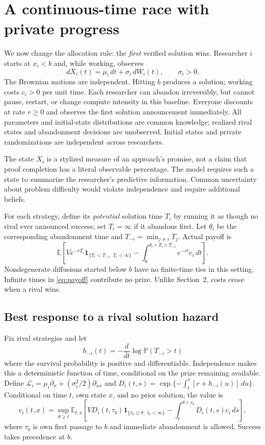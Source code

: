 \documentclass[11pt]{article}
\newcommand{\E}{\mathbb E}
\newcommand{\PP}{\mathbb P}
\newcommand{\ind}{\mathbf 1}
\newcommand{\Lgen}{\mathcal L}
\begin{document}
\section{A continuous-time race with private progress}
We now change the allocation rule: the \emph{first} verified solution wins.
Researcher $i$ starts at $x_i<b$ and, while working, observes
\begin{equation}\label{eq:diffusion}
dX_i(t)=\mu_i\,dt+\sigma_i\,dW_i(t),\qquad \sigma_i>0.
\end{equation}
The Brownian motions are independent. Hitting $b$ produces a solution;
working costs $c_i>0$ per unit time. Each researcher can abandon
irreversibly, but cannot pause, restart, or change compute intensity in
this baseline. Everyone discounts at rate $r\ge0$ and observes the first
solution announcement immediately. All parameters and initial-state
distributions are common knowledge; realized rival states and abandonment
decisions are unobserved. Initial states and private randomizations are
independent across researchers.

The state $X_i$ is a stylized measure of an approach's promise, not a claim
that proof completion has a literal observable percentage. The model
requires such a state to summarize the researcher's predictive information.
Common uncertainty about problem difficulty would violate independence
and require additional beliefs.

For each strategy, define its \emph{potential} solution time $T_i$ by
running it as though no rival ever announced success; set $T_i=\infty$
if it abandons first. Let $\theta_i$ be the corresponding abandonment
time and $T_{-i}=\min_{j\ne i}T_j$. Actual payoff is
\begin{equation}\label{eq:payoff}
\E\left[V e^{-rT_i}\ind_{\{T_i<T_{-i},\ T_i<\infty\}}
 -\int_0^{\theta_i\wedge T_i\wedge T_{-i}}e^{-rt}c_i\,dt\right].
\end{equation}
Nondegenerate diffusions started below $b$ have no finite-time ties in
this setting. Infinite times in \eqref{eq:payoff} contribute no prize.
Unlike Section~2, costs cease when a rival wins.

\subsection{Best response to a rival solution hazard}
Fix rival strategies and let
\[
h_{-i}(t)=-\frac{d}{dt}\log\PP(T_{-i}>t)
\]
where the survival probability is positive and differentiable. Independence
makes this a deterministic function of time, conditional on the prize
remaining available. Define
$\Lgen_i=\mu_i\partial_x+(\sigma_i^2/2)\partial_{xx}$ and
$D_i(t,s)=\exp\{-\int_t^s[r+h_{-i}(u)]\,du\}$.
Conditional on time $t$, own state $x$, and no prior solution, the value is
\begin{equation}\label{eq:stopvalue}
v_i(t,x)=\sup_{\theta\ge t}\E_{t,x}\left[
 VD_i(t,\tau_b)\ind_{\{\tau_b\le\theta,\ \tau_b<\infty\}}
 -\int_t^{\theta\wedge\tau_b}D_i(t,s)c_i\,ds\right],
\end{equation}
where $\tau_b$ is own first passage to $b$ and immediate abandonment is
allowed. Success takes precedence at $b$.
\end{document}
